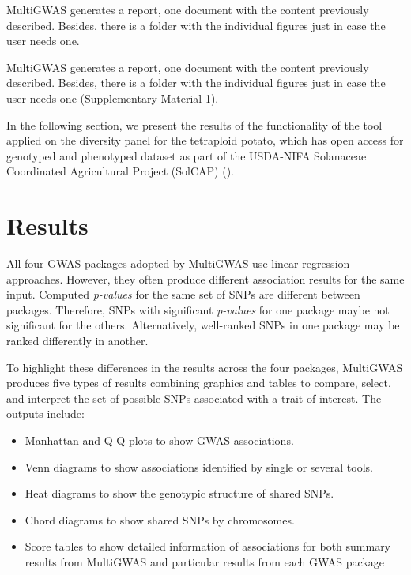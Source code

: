 \documentclass{article}
\begin{document}
MultiGWAS generates a report, one document with the content previously described. Besides, there is a folder with the individual figures just in case the user needs one.%

MultiGWAS generates a report, one document with the content previously described. Besides, there is a folder with the individual figures just in case the user needs one (Supplementary Material 1).%


In the following section, we present the results of the functionality of the tool applied on the diversity panel for the tetraploid potato, which has open access for genotyped and phenotyped dataset as part of the USDA-NIFA Solanaceae Coordinated Agricultural Project (SolCAP) (\cite{Hirsch2013}).

\section{Results}
All four GWAS packages adopted by MultiGWAS use linear regression approaches. However, they often produce different association results for the same input. Computed \emph{p-values }for the same set of SNPs are different between packages. Therefore, SNPs with significant \emph{p-values} for one package maybe not significant for the others. Alternatively, well-ranked SNPs in one package may be ranked differently in another. 

To highlight these differences in the results across the four packages, MultiGWAS produces five types of results combining graphics and tables to compare, select, and interpret the set of possible SNPs associated with a trait of interest. The outputs include: 
\begin{itemize}
\item Manhattan and Q-Q plots to show GWAS associations. 
\item Venn diagrams to show associations identified by single or several tools.
\item Heat diagrams to show the genotypic structure of shared SNPs.
\item Chord diagrams to show shared SNPs by chromosomes.
\item Score tables to show detailed information of associations for both summary results from MultiGWAS and particular results from each GWAS
package
\end{itemize}
\end{document}
